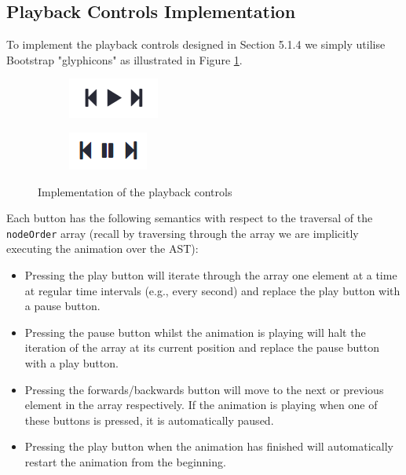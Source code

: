 \documentclass{l4proj}
\begin{document}
\subsection{Playback Controls Implementation}
To implement the playback controls designed in Section 5.1.4 we simply utilise Bootstrap "glyphicons" as illustrated in Figure \ref{fig:implplayback}.
\begin{figure}[h]
	\centering
	\begin{subfigure}[b]{.5\textwidth}
		\centering
		\includegraphics[width=.3\linewidth]{images/implplay.PNG}
	\end{subfigure}%
	\begin{subfigure}[b]{.5\textwidth}
		\centering
		\includegraphics[width=.3\linewidth]{images/implpause.PNG}
	\end{subfigure}
	\caption{Implementation of the playback controls}
	\label{fig:implplayback}	
\end{figure}

Each button has the following semantics with respect to the traversal of the \texttt{nodeOrder} array (recall by traversing through the array we are implicitly executing the animation over the AST):
\begin{itemize}
    \item Pressing the play button will iterate through the array one element at a time at regular time intervals (e.g., every second) and replace the play button with a pause button.
    \item Pressing the pause button whilst the animation is playing will halt the iteration of the array at its current position and replace the pause button with a play button.
    \item Pressing the forwards/backwards button will move to the next or previous element in the array respectively. If the animation is playing when one of these buttons is pressed, it is automatically paused.
    \item Pressing the play button when the animation has finished will automatically restart the animation from the beginning.
\end{itemize}
\end{document}
